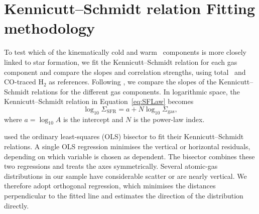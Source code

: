 



\section[Kennicutt--Schmidt relation Fitting methodology]{Kennicutt--Schmidt relation Fitting methodology}
\label{sec:ks_fitting}
\label{sec:sflaw}


\label{sec:ks_fitting_method}
To test which of the kinematically cold and warm \HI\ components is more closely linked to star formation, we fit the Kennicutt--Schmidt relation for each gas component and compare the slopes and correlation strengths, using total \HI\ and CO-traced H$_2$ as references. 
Following \citet{Fbigiel2008}, we compare the slopes of the Kennicutt--Schmidt relations for the different gas components. In logarithmic space, the Kennicutt--Schmidt relation in Equation~\ref{eq:SFLaw} becomes
\begin{equation}
\label{eq:ks_log_relation}
\log_{10}\Sigma_{\mathrm{SFR}} = a + N\log_{10}\Sigma_{\mathrm{gas}},
\end{equation}
where $a=\log_{10}A$ is the intercept and $N$ is the power-law index.

\citet{Fbigiel2008} used the ordinary least-squares (OLS) bisector to fit their Kennicutt--Schmidt relations. A single OLS regression minimises the vertical or horizontal residuals, depending on which variable is chosen as dependent. The bisector combines these two regressions and treats the axes symmetrically. Several atomic-gas distributions in our sample have considerable scatter or are nearly vertical. We therefore adopt orthogonal regression, which minimises the distances perpendicular to the fitted line and estimates the direction of the distribution directly.

